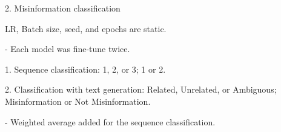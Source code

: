2. Misinformation classification

LR, Batch size, seed, and epochs are static.

- Each model was fine-tune twice.

    1. Sequence classification: 1, 2, or 3; 1 or 2.

    2. Classification with text generation: Related, Unrelated, or Ambiguous; Misinformation or Not Misinformation.

- Weighted average added for the sequence classification.


